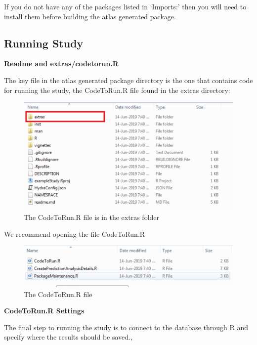 \documentclass[11pt]{book}
\theoremstyle{definition}
\theoremstyle{definition}
\theoremstyle{definition}
\theoremstyle{remark}
\begin{document}
If you do not have any of the packages listed in `Imports:' then you will need to install them before building the atlas generated package.

\hypertarget{running-study}{%
\subsection{Running Study}\label{running-study}}

\textbf{Readme and extras/codetorun.R}

The key file in the atlas generated package directory is the one that contains code for running the study, the CodeToRun.R file found in the extras directory:

\begin{figure}
\includegraphics[width=1\linewidth]{images/PatientLevelPrediction/atlasImplementation/download_folder_extras} \caption{The CodeToRun.R file is in the extras folder}\label{fig:figureU17}
\end{figure}

We recommend opening the file CodeToRun.R

\begin{figure}
\includegraphics[width=1\linewidth]{images/PatientLevelPrediction/atlasImplementation/code_to_run} \caption{The CodeToRun.R file}\label{fig:figureU18}
\end{figure}

\textbf{CodeToRun.R Settings}

The final step to running the study is to connect to the database through R and specify where the results should be saved.,
\end{document}
